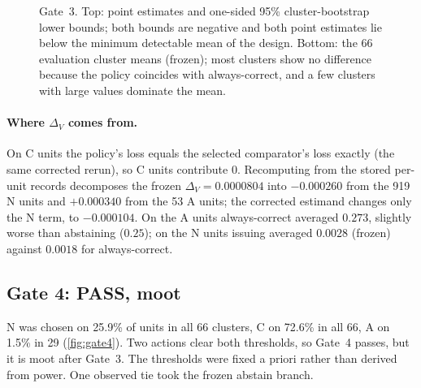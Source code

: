\documentclass[10pt,twocolumn]{article}
\theoremstyle{definition}
\theoremstyle{remark}
\newcommand{\DV}{\Delta_V}
\begin{document}
\begin{figure}[t]
\caption{Gate~3. Top: point estimates and one-sided 95\% cluster-bootstrap lower bounds; both bounds are negative and both point estimates lie below the minimum detectable mean of the design. Bottom: the 66 evaluation cluster means (frozen); most clusters show no difference because the policy coincides with always-correct, and a few clusters with large values dominate the mean.}
\label{fig:gate3}
\end{figure}

\paragraph{Where $\DV$ comes from.} On C units the policy's loss equals the selected comparator's loss exactly (the same corrected rerun), so C units contribute $0$. Recomputing from the stored per-unit records decomposes the frozen $\DV=0.0000804$ into $-0.000260$ from the 919 N units and $+0.000340$ from the 53 A units; the corrected estimand changes only the N term, to $-0.000104$. On the A units always-correct averaged $0.273$, slightly worse than abstaining ($0.25$); on the N units issuing averaged $0.0028$ (frozen) against $0.0018$ for always-correct.

\subsection{Gate 4: PASS, moot}
N was chosen on 25.9\% of units in all 66 clusters, C on 72.6\% in all 66, A on 1.5\% in 29 (\cref{fig:gate4}). Two actions clear both thresholds, so Gate~4 passes, but it is moot after Gate~3. The thresholds were fixed a priori rather than derived from power. One observed tie took the frozen abstain branch.
\end{document}
